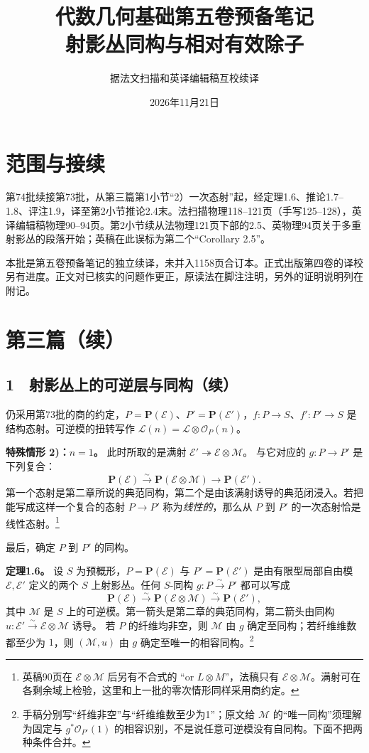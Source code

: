 \documentclass[openany,fontset=fandol]{ctexbook}
\newcommand{\OO}{\mathcal O}
\newcommand{\LL}{\mathcal L}
\newcommand{\MM}{\mathcal M}
\newcommand{\EE}{\mathcal E}
\begin{document}
\title{代数几何基础第五卷预备笔记\\射影丛同构与相对有效除子}
\author{据法文扫描和英译编辑稿互校续译}
\date{2026年11月21日}
\maketitle
\chapter*{范围与接续}
第74批续接第73批，从第三篇第1小节“2）一次态射”起，经定理1.6、推论1.7--1.8、评注1.9，译至第2小节推论2.4末。法扫描物理118--121页（手写125--128），英译编辑稿物理90--94页。第2小节续从法物理121页下部的2.5、英物理94页关于多重射影丛的段落开始；英稿在此误标为第二个“Corollary 2.5”。

本批是第五卷预备笔记的独立续译，未并入1158页合订本。正式出版第四卷的译校另有进度。正文对已核实的问题作更正，原读法在脚注注明，另外的证明说明列在附记。
\chapter*{第三篇（续）}
\section*{1　射影丛上的可逆层与同构（续）}
仍采用第73批的商的约定，\(P=\mathbf P(\EE)\)、\(P'=\mathbf P(\EE')\)，\(f:P\to S\)、\(f':P'\to S\) 是结构态射。可逆模的扭转写作 \(\LL(n)=\LL\otimes\OO_P(n)\)。

\noindent\textbf{特殊情形 2)：\(n=1\)。}
此时所取的是满射
\(\EE'\twoheadrightarrow\EE\otimes\MM\)。
与它对应的 \(g:P\to P'\) 是下列复合：
\[
 \mathbf P(\EE)\xrightarrow{\sim}\mathbf P(\EE\otimes\MM)
       \longrightarrow\mathbf P(\EE').
\]
第一个态射是第二章所说的典范同构，第二个是由该满射诱导的典范闭浸入。若把能写成这样一个复合的态射 \(P\to P'\) 称为\emph{线性的}，那么从 \(P\) 到 \(P'\) 的一次态射恰是线性态射。\footnote{英稿90页在 \(\EE\otimes\MM\) 后另有不合式的 “or \(L\otimes M\)”，法稿只有 \(\EE\otimes\MM\)。满射可在各剩余域上检验，这里和上一批的零次情形同样采用商约定。}

最后，确定 \(P\) 到 \(P'\) 的同构。

\medskip\noindent\textbf{定理1.6。}
设 \(S\) 为预概形，\(P=\mathbf P(\EE)\) 与 \(P'=\mathbf P(\EE')\) 是由有限型局部自由模 \(\EE,\EE'\) 定义的两个 \(S\) 上射影丛。任何 \(S\)-同构 \(g:P\xrightarrow{\sim}P'\) 都可以写成
\[
 \mathbf P(\EE)\xrightarrow{\sim}\mathbf P(\EE\otimes\MM)
      \xrightarrow{\sim}\mathbf P(\EE'),
\]
其中 \(\MM\) 是 \(S\) 上的可逆模。第一箭头是第二章的典范同构，第二箭头由同构
\(u:\EE'\xrightarrow{\sim}\EE\otimes\MM\) 诱导。
若 \(P\) 的纤维均非空，则 \(\MM\) 由 \(g\) 确定至同构；若纤维维数都至少为 \(1\)，则 \((\MM,u)\) 由 \(g\) 确定至唯一的相容同构。\footnote{手稿分别写“纤维非空”与“纤维维数至少为1”；原文给 \(\MM\) 的“唯一同构”须理解为固定与 \(g^*\OO_{P'}(1)\) 的相容识别，不是说任意可逆模没有自同构。下面不把两种条件合并。}
\end{document}
